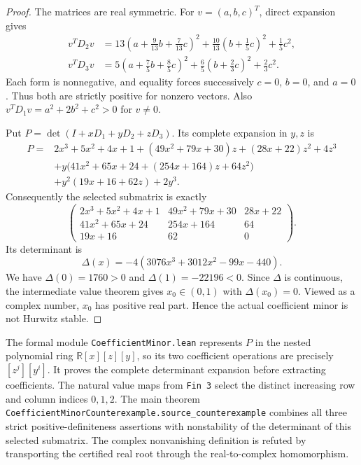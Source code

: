 \documentclass[11pt]{article}
\begin{document}
\begin{proof}
The matrices are real symmetric. For $v=(a,b,c)^T$, direct expansion gives
\begin{align*}
v^TD_2v&=13\left(a+\frac9{13}b+\frac7{13}c\right)^2
 +\frac{10}{13}\left(b+\frac15c\right)^2+\frac15c^2,\\
v^TD_3v&=5\left(a+\frac75b+\frac85c\right)^2
 +\frac65\left(b+\frac23c\right)^2+\frac23c^2.
\end{align*}
Each form is nonnegative, and equality forces successively $c=0$, $b=0$, and $a=0$. Thus both are strictly positive for nonzero vectors. Also $v^TD_1v=a^2+2b^2+c^2>0$ for $v\ne0$.

Put $P=\det(I+xD_1+yD_2+zD_3)$. Its complete expansion in $y,z$ is
\begin{align*}
P={}&2x^3+5x^2+4x+1+(49x^2+79x+30)z+(28x+22)z^2+4z^3\\
 &+y\bigl(41x^2+65x+24+(254x+164)z+64z^2\bigr)\\
 &+y^2(19x+16+62z)+2y^3.
\end{align*}
Consequently the selected submatrix is exactly
\[
 \begin{pmatrix}
2x^3+5x^2+4x+1&49x^2+79x+30&28x+22\\
41x^2+65x+24&254x+164&64\\
19x+16&62&0
\end{pmatrix}.
\]
Its determinant is
\[
\Delta(x)=-4(3076x^3+3012x^2-99x-440).
\]
We have $\Delta(0)=1760>0$ and $\Delta(1)=-22196<0$. Since $\Delta$ is continuous, the intermediate value theorem gives $x_0\in(0,1)$ with $\Delta(x_0)=0$. Viewed as a complex number, $x_0$ has positive real part. Hence the actual coefficient minor is not Hurwitz stable.
\end{proof}
The formal module \texttt{CoefficientMinor.lean} represents $P$ in the nested polynomial ring $\mathbb R[x][z][y]$, so its two coefficient operations are precisely $[z^j][y^i]$. It proves the complete determinant expansion before extracting coefficients. The natural value maps from \texttt{Fin 3} select the distinct increasing row and column indices $0,1,2$. The main theorem \texttt{CoefficientMinorCounterexample.source\_counterexample} combines all three strict positive-definiteness assertions with nonstability of the determinant of this selected submatrix. The complex nonvanishing definition is refuted by transporting the certified real root through the real-to-complex homomorphism.
\end{document}
